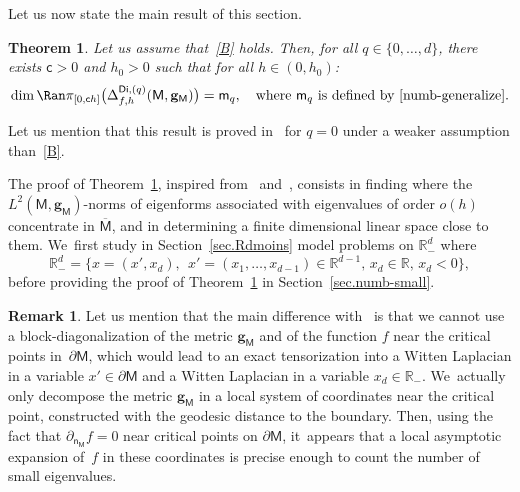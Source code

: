 \documentclass[10pt]{amsart}
\newcommand{\mbf}[1]{\mathbf{#1}}
\let\pa\partial
\theoremstyle{plain}
\newtheorem{theorem}{Theorem}
\theoremstyle{definition}
\newtheorem{remark}[proposition]{Remark}
\begin{document}
Let us now state the main result of this section.
\begin{theorem}\label{thm.main1}
Let us assume that~\ref{B} holds. Then, for all $q\in \{0,\ldots,d\}$, there exists $\mathsf c>0$ and $h_0>0$ such that for all $h\in (0,h_0)$:\vspace*{-3pt}
\[
\dim \Ran \pi_{[0,\mathsf ch]}\bigl(\Delta_{f,h}^{\mathsf{Di},(q)}(\mathsf M,\mbf g_{\mathsf M})\bigr)=\mathsf m_q, \quad \text{where $\mathsf m_q$ is defined by~\eqref{numb-generalize}}.
\]
\end{theorem}

Let us mention that this result is proved in~\cite{DoNe2} for $q=0$ under a weaker assumption than~\ref{B}.

The proof of Theorem~\ref{thm.main1}, inspired from~\cite[\S 3]{helffer-nier-06} and~\cite{CFKS}, consists in finding where the $L^2(\mathsf
M,\mbf g_{\mathsf M})$-norms of eigenforms associated with eigenvalues
of order $o(h)$ concentrate in $\overline{\mathsf M}$, and in
determining a finite dimensional linear space close to them. We~first
study in
Section~\ref{sec.Rdmoins} model problems on $\mathbb R^{d}_-$ where\vspace*{-3pt}
\[
\mathbb
R^d_-=\{x=(x',x_d),\ \ x'=(x_1,\ldots,x_{d-1})\in \mathbb R^{d-1}, \,
x_d\in \mathbb R, \, x_d<0\},
\]
before providing the proof of Theorem~\ref{thm.main1} in Section~\ref{sec.numb-small}.

\begin{remark}\label{rem:numb-small}
Let us mention that the main difference with~\cite[Chap.\,3]{helffer-nier-06}
is that we cannot use a block-diagonalization of the metric $\mbf
g_{\mathsf M}$ and of the function $f$ near the critical points
in~$\pa \mathsf M$, which would lead to an exact tensorization into a Witten Laplacian in a variable $x'\in \pa \mathsf M$ and a Witten
Laplacian in a variable $x_d\in \mathbb R_-$. We~actually only decompose the metric $\mbf g_{\mathsf
M}$ in a local system of coordinates near the critical point,
constructed with the geodesic distance to the boundary. Then, using the
fact that $\partial_{\mathsf n_{\mathsf
M}}f=0$ near critical points on $\partial \mathsf M$, it~appears that a local
asymptotic expansion of~$f$ in these coordinates is precise enough to count the number of small eigenvalues.
\end{remark}
\end{document}
